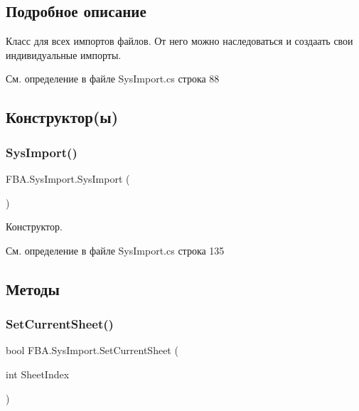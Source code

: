 \subsection{Подробное описание}
Класс для всех импортов файлов. От него можно наследоваться и создаать свои индивидуальные импорты. 



См. определение в файле Sys\+Import.\+cs строка 88



\subsection{Конструктор(ы)}
\mbox{\label{class_f_b_a_1_1_sys_import_a95e27f0adbca1a2f8d289e604164f520}} 
\subsubsection{\texorpdfstring{Sys\+Import()}{SysImport()}}
{\footnotesize\ttfamily F\+B\+A.\+Sys\+Import.\+Sys\+Import (\begin{DoxyParamCaption}{ }\end{DoxyParamCaption})}



Конструктор. 



См. определение в файле Sys\+Import.\+cs строка 135



\subsection{Методы}
\mbox{\label{class_f_b_a_1_1_sys_import_ab078f21c83d256d6f76861d62b34b5f4}} 
\subsubsection{\texorpdfstring{Set\+Current\+Sheet()}{SetCurrentSheet()}\hspace{0.1cm}{\footnotesize\ttfamily [1/2]}}
{\footnotesize\ttfamily bool F\+B\+A.\+Sys\+Import.\+Set\+Current\+Sheet (\begin{DoxyParamCaption}\item[{int}]{Sheet\+Index }\end{DoxyParamCaption})}



